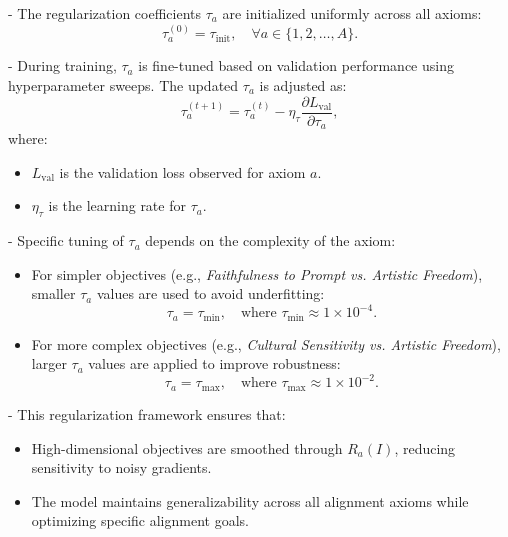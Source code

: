 \begin{itemize}
    - The regularization coefficients \(\tau_a\) are initialized uniformly across all axioms:
    \[
    \tau_a^{(0)} = \tau_{\text{init}}, \quad \forall a \in \{1, 2, \dots, A\}.
    \]

    - During training, \(\tau_a\) is fine-tuned based on validation performance using hyperparameter sweeps. The updated \(\tau_a\) is adjusted as:
    \[
    \tau_a^{(t+1)} = \tau_a^{(t)} - \eta_\tau \frac{\partial L_{\text{val}}}{\partial \tau_a},
    \]
    where:
    \begin{itemize}
        \item \(L_{\text{val}}\) is the validation loss observed for axiom \(a\).
        \item \(\eta_\tau\) is the learning rate for \(\tau_a\).  
    \end{itemize}

    - Specific tuning of \(\tau_a\) depends on the complexity of the axiom:
        \begin{itemize}
            \item For simpler objectives (e.g., \textit{Faithfulness to Prompt vs. Artistic Freedom}), smaller \(\tau_a\) values are used to avoid underfitting:
            \[
            \tau_a = \tau_{\text{min}}, \quad \text{where } \tau_{\text{min}} \approx 1 \times 10^{-4}.
            \]
            \item For more complex objectives (e.g., \textit{Cultural Sensitivity vs. Artistic Freedom}), larger \(\tau_a\) values are applied to improve robustness:
            \[
            \tau_a = \tau_{\text{max}}, \quad \text{where } \tau_{\text{max}} \approx 1 \times 10^{-2}.
            \]
        \end{itemize}

    - This regularization framework ensures that:
        \begin{itemize}
            \item High-dimensional objectives are smoothed through \(R_a(I)\), reducing sensitivity to noisy gradients.  
            \item The model maintains generalizability across all alignment axioms while optimizing specific alignment goals.  
        \end{itemize}
\end{itemize}

